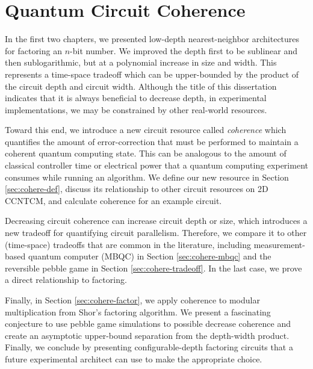\chapter{Quantum Circuit Coherence}
\label{chap:coherence}

In the first two chapters, we presented low-depth nearest-neighbor
architectures for factoring an $n$-bit number. We improved the depth first to
be sublinear and then sublogarithmic, but at a polynomial increase in size
and width. This represents a time-space tradeoff which can be upper-bounded
by the product of the circuit depth and circuit width. Although the title of
this dissertation indicates that it is always beneficial to decrease depth, in
experimental implementations, we may be constrained by other real-world
resources.

Toward this end, we introduce a new circuit resource called \emph{coherence}
which quantifies the amount of error-correction that must be performed
to maintain a coherent quantum computing state. This can be analogous to
the amount of classical controller time or electrical power that a
quantum computing experiment consumes while running an algorithm. We
define our new resource in Section \ref{sec:cohere-def}, discuss its
relationship to other circuit resources on \textsf{2D CCNTCM}, and
calculate coherence for an example circuit.

Decreasing circuit coherence can increase circuit depth or size, which introduces
a new tradeoff for quantifying circuit parallelism.
Therefore, we compare it to other (time-space) tradeoffs that are common in
the literature, including measurement-based quantum computer (MBQC) in
Section \ref{sec:cohere-mbqc} and the reversible pebble game in
Section \ref{sec:cohere-tradeoff}. In the last case, we prove a
direct relationship to factoring.

Finally, in Section \ref{sec:cohere-factor}, we apply coherence to modular
multiplication from Shor's factoring algorithm.
We present a fascinating conjecture to use pebble game simulations to
possible decrease coherence and create an asymptotic upper-bound
separation from the depth-width product.
Finally, we conclude
by presenting configurable-depth factoring circuits
that a future experimental architect can use to make the appropriate choice.










%

%